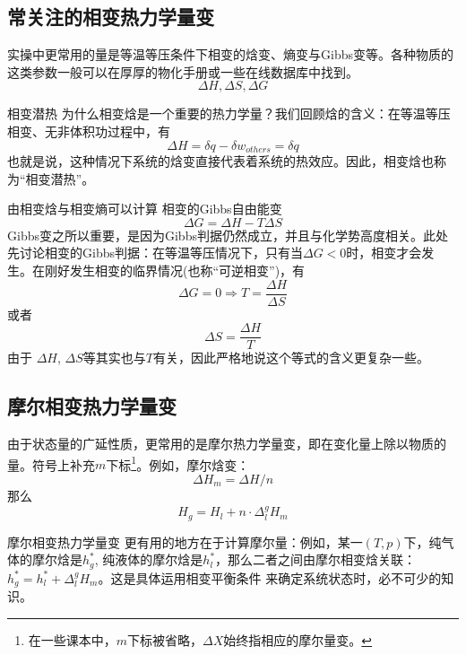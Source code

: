 \subsection{常关注的相变热力学量变}
实操中更常用的量是等温等压条件下相变的焓变、熵变与Gibbs变等。各种物质的这类参数一般可以在厚厚的物化手册或一些在线数据库中找到。
$$
\Delta H, \Delta  S, \Delta G
$$

\begin{example}{相变潜热}
为什么相变焓是一个重要的热力学量？我们回顾焓的含义：在等温等压相变、无非体积功过程中，有
$$
\Delta H = \delta q - \delta w_{others} = \delta q
$$
也就是说，这种情况下系统的焓变直接代表着系统的热效应。因此，相变焓也称为“相变潜热”。
\end{example}

由相变焓与相变熵可以计算 相变的Gibbs自由能变
$$
\Delta G = \Delta H - T \Delta S
$$
Gibbs变之所以重要，是因为Gibbs判据仍然成立，并且与化学势高度相关。此处先讨论相变的Gibbs判据：在等温等压情况下，只有当$\Delta G<0$时，相变才会发生。在刚好发生相变的临界情况(也称“可逆相变”)，有
$$
\Delta G = 0 \Rightarrow T = \frac{\Delta H}{\Delta S}
$$
或者
$$
\Delta S = \frac{\Delta H}{T}
$$
由于 $\Delta H$, $\Delta S$等其实也与$T$有关，因此严格地说这个等式的含义更复杂一些。

\subsection{摩尔相变热力学量变}
由于状态量的广延性质，更常用的是摩尔热力学量变，即在变化量上除以物质的量。符号上补充$m$下标\footnote{在一些课本中，$m$下标被省略，$\Delta X$始终指相应的摩尔量变。}。例如，摩尔焓变：
$$
\Delta H_m = \Delta H / n
$$
那么
$$
H_g = H_l + n \cdot \Delta^g_l H_m
$$

摩尔相变热力学量变 更有用的地方在于计算摩尔量：例如，某一$(T,p)$下，纯气体的摩尔焓是$h^*_g$, 纯液体的摩尔焓是$h^*_l$，那么二者之间由摩尔相变焓关联：$h^*_g = h^*_l + \Delta^g_l H_m$。这是具体运用相变平衡条件 来确定系统状态时，必不可少的知识。
